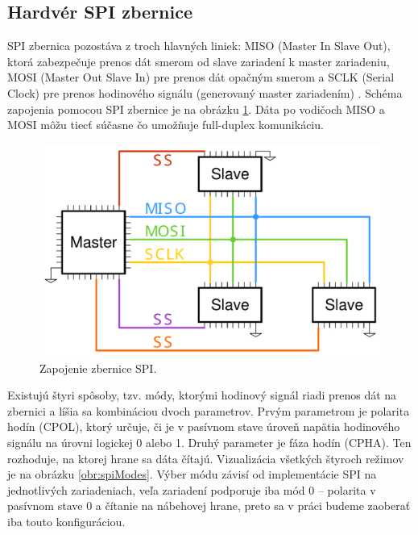 \subsection{Hardvér SPI zbernice}
SPI zbernica pozostáva z troch hlavných liniek: MISO (Master In Slave Out), ktorá zabezpečuje prenos dát smerom od slave zariadení k master zariadeniu, MOSI (Master Out Slave In) pre prenos dát opačným smerom a SCLK (Serial Clock) pre prenos hodinového signálu (generovaný master zariadením) \cite{spiBus}. Schéma zapojenia pomocou SPI zbernice je na obrázku \ref{obr:spiWiring}. Dáta po vodičoch MISO a MOSI môžu tiecť súčasne čo umožňuje full-duplex komunikáciu.

\begin{figure}
    \centerline{\includegraphics[width=1\textwidth]{images/busses/spiWiring.pdf}}
    \caption[Zapojenie zbernice SPI]{Zapojenie zbernice SPI.}
    \label{obr:spiWiring}
\end{figure}

Existujú štyri spôsoby, tzv. módy, ktorými hodinový signál riadi prenos dát na zbernici a líšia sa kombináciou dvoch parametrov. Prvým parametrom je polarita hodín (CPOL), ktorý určuje, či je v pasívnom stave úroveň napätia hodinového signálu na úrovni logickej 0 alebo 1. Druhý parameter je fáza hodín (CPHA). Ten rozhoduje, na ktorej hrane sa dáta čítajú. Vizualizácia všetkých štyroch režimov je na obrázku \ref{obr:spiModes}. Výber módu závisí od implementácie SPI na jednotlivých zariadeniach, veľa zariadení podporuje iba mód 0 -- polarita v pasívnom stave 0 a čítanie na nábehovej hrane, preto sa v práci budeme zaoberať iba touto konfiguráciou.

